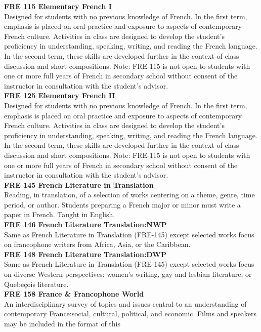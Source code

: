 \documentclass[
  letterpaper,
]{scrbook}
\begin{document}
\textbf{FRE 115 Elementary French I}\\
Designed for students with no previous knowledge of French. In the first
term, emphasis is placed on oral practice and exposure to aspects of
contemporary French culture. Activities in class are designed to develop
the student's proficiency in understanding, speaking, writing, and
reading the French language. In the second term, these skills are
developed further in the context of class discussion and short
compositions. Note: FRE-115 is not open to students with one or more
full years of French in secondary school without consent of the
instructor in consultation with the student's advisor.\\
\textbf{FRE 125 Elementary French II}\\
Designed for students with no previous knowledge of French. In the first
term, emphasis is placed on oral practice and exposure to aspects of
contemporary French culture. Activities in class are designed to develop
the student's proficiency in understanding, speaking, writing, and
reading the French language. In the second term, these skills are
developed further in the context of class discussion and short
compositions. Note: FRE-115 is not open to students with one or more
full years of French in secondary school without consent of the
instructor in consultation with the student's advisor.\\
\textbf{FRE 145 French Literature in Translation}\\
Reading, in translation, of a selection of works centering on a theme,
genre, time period, or author. Students preparing a French major or
minor must write a paper in French. Taught in English.\\
\textbf{FRE 146 French Literature Translation:NWP}\\
Same as French Literature in Translation (FRE-145) except selected works
focus on francophone writers from Africa, Asia, or the Caribbean.\\
\textbf{FRE 148 French Literature Translation:DWP}\\
Same as French Literature in Translation (FRE-145) except selected works
focus on diverse Western perspectives: women's writing, gay and lesbian
literature, or Quebeçois literature.\\
\textbf{FRE 158 France \& Francophone World}\\
An interdisciplinary survey of topics and issues central to an
understanding of contemporary France:social, cultural, political, and
economic. Films and speakers may be included in the format of this
\end{document}
